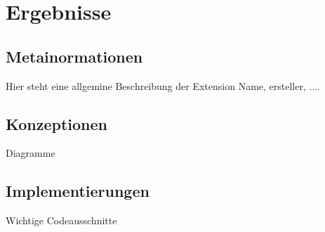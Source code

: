 \chapter{Ergebnisse}
\label{chap:ergebnisse}

\section{Metainormationen}
Hier steht eine allgemine Beschreibung der Extension Name, ersteller, ....

\section{Konzeptionen}
Diagramme

\section{Implementierungen}
Wichtige Codeausschnitte